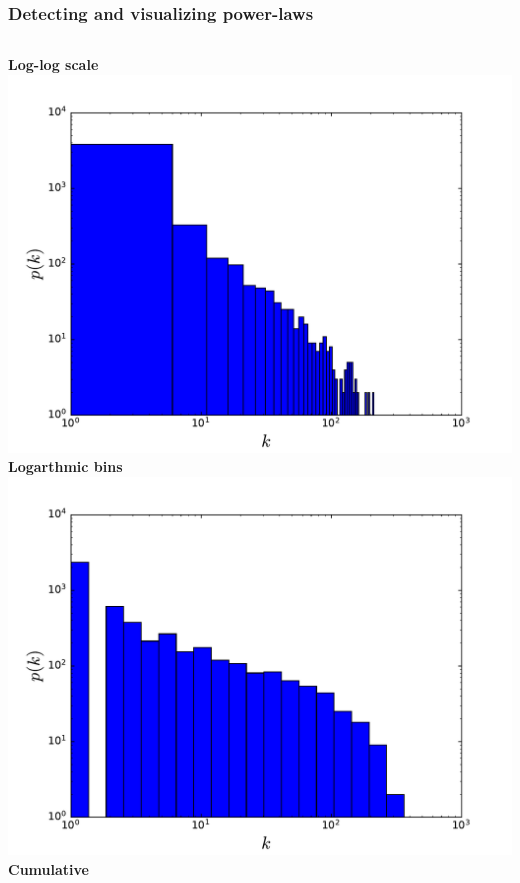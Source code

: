 \documentclass{beamer}
\begin{document}
\begin{frame}
    \frametitle{Detecting and visualizing power-laws}
    \begin{columns}
        \centering
        {\bf Log-log scale}
        \includegraphics[width=\columnwidth]{deg_distri_global_airport_log.pdf}
        \centering
        {\bf Logarthmic bins}
        \includegraphics[width=\columnwidth]{deg_distri_global_airport_log_logbins.pdf}
        \centering
        {\bf Cumulative }

\end{columns}
\end{frame}
\end{document}
